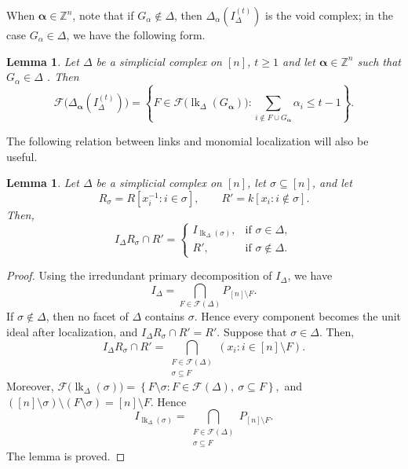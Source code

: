 \documentclass[12pt]{amsart}
\newtheorem{lemma}[proposition]{Lemma}
\DeclareMathOperator{\lk}{lk}
\begin{document}
When \(\boldsymbol\alpha\in\mathbb Z^n\), note that if $G_\alpha\notin\Delta$, then $\Delta_\alpha(I_\Delta^{(t)})$ is the void complex; in the case $G_\alpha\in\Delta$, we have the following form.

\begin{lemma}{\cite[Lemma~1.3]{HT2}}\label{HoaTrLem}
Let \(\Delta\) be a simplicial complex on \([n]\), \(t \ge 1\) and let \(\boldsymbol\alpha\in\mathbb Z^n\) such that \(G_\alpha\in\Delta\) . Then
\[
\mathcal F\bigl(\Delta_{\boldsymbol\alpha}(I_\Delta^{(t)})\bigr)
=
\left\{
F\in\mathcal F\bigl(\lk_\Delta(G_{\boldsymbol\alpha})\bigr):
\sum_{i\notin F\cup G_{\boldsymbol\alpha}}\alpha_i\le t-1
\right\}.
\]
\end{lemma}

The following relation between links and monomial localization will also be useful.

\begin{lemma}\label{lem:localization}
Let \(\Delta\) be a simplicial complex on \([n]\), let \(\sigma\subseteq[n]\), and let
\[
R_\sigma=R[x_i^{-1}:i\in\sigma],
\qquad
R'=k[x_i:i\notin\sigma].
\]
Then, 
\[
I_\Delta R_\sigma\cap R'
=
\begin{cases}
I_{\lk_\Delta(\sigma)}, & \text{if }\sigma\in\Delta,\\
R', & \text{if }\sigma\notin\Delta.
\end{cases}
\]
\end{lemma}


\begin{proof}
Using the irredundant primary decomposition of \(I_\Delta\), we have
\[
I_\Delta
=
\bigcap_{F\in\mathcal F(\Delta)}P_{[n]\setminus F}.
\]
If \(\sigma\notin\Delta\), then no facet of \(\Delta\) contains \(\sigma\). Hence every component becomes the unit ideal after localization, and \(I_\Delta R_\sigma\cap R'=R'.
\)
\noindent
Suppose that \(\sigma\in\Delta\). Then,
\[
I_\Delta R_\sigma\cap R'
=
\bigcap_{\substack{F\in\mathcal F(\Delta)\\ \sigma\subseteq F}}
(x_i:i\in[n]\setminus F).
\]
Moreover, $\mathcal F\bigl(\lk_\Delta(\sigma)\bigr)
=
\left\{
F\setminus\sigma:
F\in\mathcal F(\Delta),\ \sigma\subseteq F
\right\},$
and $([n]\setminus\sigma)\setminus(F\setminus\sigma)
=
[n]\setminus F.$
Hence
\[
I_{\lk_\Delta(\sigma)}
=
\bigcap_{\substack{F\in\mathcal F(\Delta)\\ \sigma\subseteq F}}
P_{[n]\setminus F}.
\]
The lemma is proved. 

\end{proof}
\end{document}
